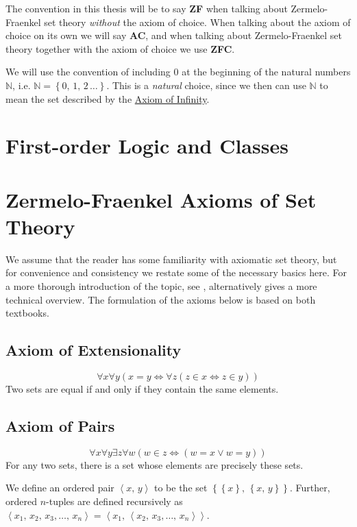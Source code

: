\documentclass[../../main.tex]{subfiles}
\begin{document}
The convention in this thesis will be to say \textbf{ZF} when talking about Zermelo-Fraenkel set theory \textit{without} the axiom of choice.
When talking about the axiom of choice on its own we will say \textbf{AC}, and when talking about Zermelo-Fraenkel set theory together with the axiom of choice we use \textbf{ZFC}.

We will use the convention of including $0$ at the beginning of the natural numbers $\mathbb{N}$, i.e. $\mathbb{N} = \left\{0, \, 1, \, 2\, \ldots\right\}$.
This is a \textit{natural} choice, since we then can use $\mathbb{N}$ to mean the set described by the \hyperref[ZF7]{Axiom of Infinity}.

\section{First-order Logic and Classes}

\section{Zermelo-Fraenkel Axioms of Set Theory}
We assume that the reader has some familiarity with axiomatic set theory, but for convenience and consistency we restate some of the necessary basics here. %
For a more thorough introduction of the topic, see \cite[4.3-4.5]{Gol17}, alternatively \cite[1.1]{Jec78} gives a more technical overview.
The formulation of the axioms below is based on both textbooks.

\subsection{Axiom of Extensionality}
$$\forall x \forall y \left(x = y \iff \forall z \left(z \in x \iff z \in y\right) \right)$$
Two sets are equal if and only if they contain the same elements.\cite[4.3, p.76]{Gol17}

\subsection{Axiom of Pairs}
$$\forall x \forall y \exists z \forall w \left( w \in z \iff \left(w = x \vee w = y \right)\right)$$
For any two sets, there is a set whose elements are precisely these sets.
 
We define an ordered pair $\left<x,\, y\right>$ to be the set $\left\{\left\{x\right\},\, \left\{x,\, y\right\}\right\}$.
Further, ordered $n$-tuples are defined recursively as $\left<x_1,\, x_2,\, x_3,\ldots,\, x_n\right> = \left<x_1,\, \left<x_2,\, x_3,\ldots,\, x_n\right>\right>$.\cite[4.3, pp.76, 79-80]{Gol17}
\end{document}
